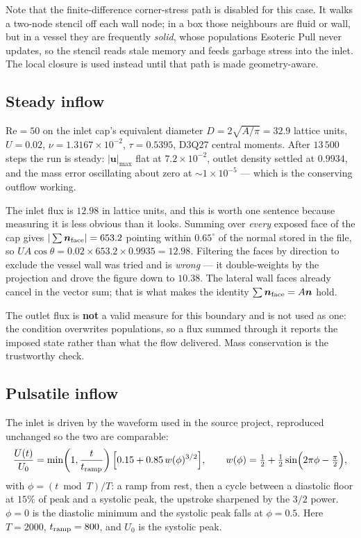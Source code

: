 \documentclass[11pt,a4paper]{article}
\newcommand{\uu}{\bm{u}}
\newcommand{\nn}{\bm{n}}
\newcommand{\e}[1]{\times 10^{#1}}
\begin{document}
Note that the finite-difference corner-stress path is disabled for this case. It
walks a two-node stencil off each wall node; in a box those neighbours are fluid
or wall, but in a vessel they are frequently \emph{solid}, whose populations
Esoteric Pull never updates, so the stencil reads stale memory and feeds garbage
stress into the inlet. The local closure is used instead until that path is made
geometry-aware.

\subsection{Steady inflow}
\label{sec:aortasteady}

$\mathrm{Re}=50$ on the inlet cap's equivalent diameter $D = 2\sqrt{A/\pi} =
32.9$ lattice units, $U=0.02$, $\nu=1.3167\e{-2}$, $\tau=0.5395$, D3Q27 central
moments. After $13\,500$ steps the run is steady: $|\uu|_{\max}$ flat at
$7.2\e{-2}$, outlet density settled at $0.9934$, and the mass error oscillating
about zero at ${\sim}1\e{-5}$ --- which is the conserving outflow working.

The inlet flux is $12.98$ in lattice units, and this is worth one sentence
because measuring it is less obvious than it looks. Summing over \emph{every}
exposed face of the cap gives $|\sum \nn_{\rm face}| = 653.2$ pointing within
$0.65^\circ$ of the normal stored in the file, so $U A\cos\theta = 0.02 \times
653.2 \times 0.9935 = 12.98$. Filtering the faces by direction to exclude the
vessel wall was tried and is \emph{wrong} --- it double-weights by the projection
and drove the figure down to $10.38$. The lateral wall faces already cancel in
the vector sum; that is what makes the identity $\sum\nn_{\rm face} = A\nn$ hold.

The outlet flux is \textbf{not} a valid measure for this boundary and is not used
as one: the condition overwrites populations, so a flux summed through it
reports the imposed state rather than what the flow delivered. Mass conservation
is the trustworthy check.

\subsection{Pulsatile inflow}
\label{sec:aortapulse}

The inlet is driven by the waveform used in the source project, reproduced
unchanged so the two are comparable:
\begin{equation}
  \frac{U(t)}{U_0} = \min\!\left(1,\frac{t}{t_{\rm ramp}}\right)
    \Big[0.15 + 0.85\,w(\phi)^{3/2}\Big],
  \qquad
  w(\phi) = \tfrac12 + \tfrac12\sin\!\Big(2\pi\phi - \tfrac{\pi}{2}\Big),
  \label{eq:aortawave}
\end{equation}
with $\phi = (t \bmod T)/T$: a ramp from rest, then a cycle between a diastolic
floor at $15\%$ of peak and a systolic peak, the upstroke sharpened by the $3/2$
power. $\phi=0$ is the diastolic minimum and the systolic peak falls at
$\phi=0.5$. Here $T=2000$, $t_{\rm ramp}=800$, and $U_0$ is the systolic peak.
\end{document}
